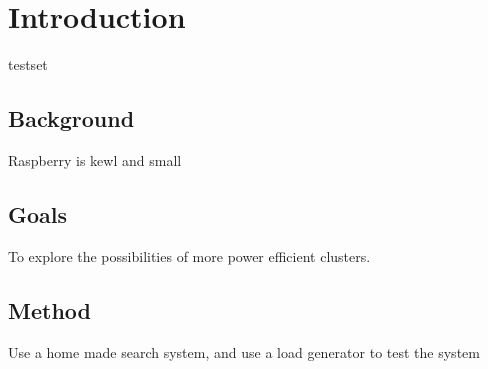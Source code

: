 \section{Introduction}
testset
\subsection{Background}
Raspberry is kewl and small
\subsection{Goals}
To explore the possibilities of more power efficient clusters.
\subsection{Method}
Use a home made search system, and use a load generator to test the system
